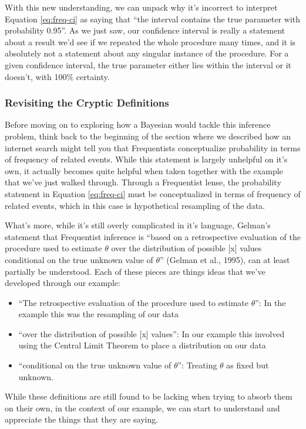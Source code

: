 \documentclass[12pt,twoside]{reedthesis}
\providecommand{\tightlist}{%
  \setlength{\itemsep}{0pt}\setlength{\parskip}{0pt}}
\begin{document}
With this new understanding, we can unpack why it's incorrect to interpret Equation \eqref{eq:freq-ci} as saying that ``the interval contains the true parameter with probability 0.95''. As we just saw, our confidence interval is really a statement about a result we'd see if we repeated the whole procedure many times, and it is absolutely not a statement about any singular instance of the procedure. For a given confidence interval, the true parameter either lies within the interval or it doesn't, with 100\% certainty.

\hypertarget{revisiting-the-cryptic-definitions}{%
\subsubsection{Revisiting the Cryptic Definitions}\label{revisiting-the-cryptic-definitions}}

Before moving on to exploring how a Bayesian would tackle this inference problem, think back to the beginning of the section where we described how an internet search might tell you that Frequentists conceptualize probability in terms of frequency of related events. While this statement is largely unhelpful on it's own, it actually becomes quite helpful when taken together with the example that we've just walked through. Through a Frequentist lense, the probability statement in Equation \eqref{eq:freq-ci} must be conceptualized in terms of frequency of related events, which in this case is hypothetical resampling of the data.

What's more, while it's still overly complicated in it's language, Gelman's statement that Frequentist inference is ``based on a retrospective evaluation of the procedure used to estimate \(\theta\) over the distribution of possible {[}x{]} values conditional on the true unknown value of \(\theta\)'' (Gelman et al., 1995), can at least partially be understood. Each of these pieces are things ideas that we've developed through our example:
\begin{itemize}
\tightlist
\item
  ``The retrospective evaluation of the procedure used to estimate \(\theta\)'': In the example this was the resampling of our data
\item
  ``over the distribution of possible {[}x{]} values'': In our example this involved using the Central Limit Theorem to place a distribution on our data
\item
  ``conditional on the true unknown value of \(\theta\)'': Treating \(\theta\) as fixed but unknown.
\end{itemize}
While these definitions are still found to be lacking when trying to absorb them on their own, in the context of our example, we can start to understand and appreciate the things that they are saying.
\end{document}
